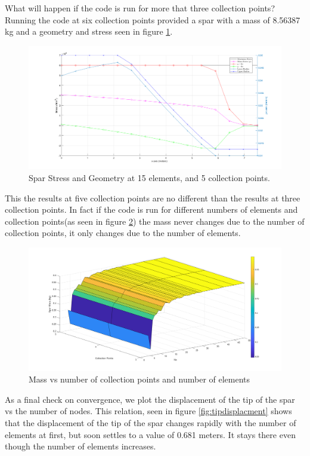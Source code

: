 \documentclass[12pt]{article}
\begin{document}
	
	What will happen if the code is run for more that three collection points? Running the code at six collection points provided a spar with a mass of 8.56387 kg and a geometry and stress seen in figure \ref{fig:fivecolcresults}.
	
	
	\begin{figure}[H]
		\centering
		\includegraphics[width=0.7\linewidth]{fiveColcResults}
		\caption{Spar Stress and Geometry  at 15 elements, and 5 collection points.}
		\label{fig:fivecolcresults}
	\end{figure}

	This the results at five collection points are no different than the results at three collection points. In fact if the code is run for different numbers of elements and collection points(as seen in figure \ref{fig:massallplt}) the mass never changes due to the number of collection points, it only changes due to the number of elements.
	
	\begin{figure}[H]
		\centering
		\includegraphics[width=0.7\linewidth]{massAllPlt}
		\caption{Mass vs number of collection points and number of elements}
		\label{fig:massallplt}
	\end{figure}

	As a final check on convergence, we plot the displacement of the tip of the spar vs the number of nodes. This relation, seen in figure \ref{fig:tipdisplacment} shows that the displacement of the tip of the spar changes rapidly with the number of elements at first, but soon settles to a value of 0.681 meters. It stays there even though the number of elements increases.
	
\end{document}
